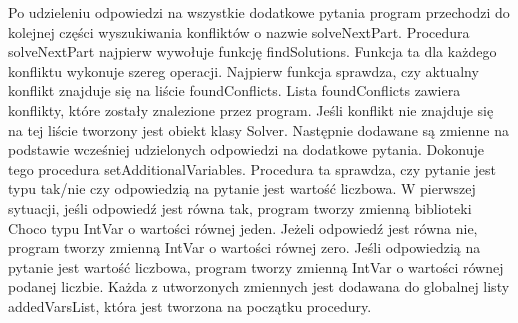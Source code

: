 Po udzieleniu odpowiedzi na wszystkie dodatkowe pytania program przechodzi do kolejnej części wyszukiwania konfliktów o nazwie solveNextPart. Procedura solveNextPart najpierw wywołuje funkcję findSolutions. 
Funkcja ta dla każdego konfliktu wykonuje szereg operacji. Najpierw funkcja sprawdza, czy aktualny konflikt znajduje się na liście foundConflicts. Lista foundConflicts zawiera konflikty, które zostały znalezione przez program. Jeśli konflikt nie znajduje się na tej liście tworzony jest obiekt klasy Solver. Następnie dodawane są zmienne na podstawie wcześniej udzielonych odpowiedzi na dodatkowe pytania. Dokonuje tego procedura setAdditionalVariables. Procedura ta sprawdza, czy pytanie jest typu tak/nie czy odpowiedzią na pytanie jest wartość liczbowa. W pierwszej sytuacji, jeśli odpowiedź jest równa tak, program tworzy zmienną biblioteki Choco typu IntVar o wartości równej jeden. Jeżeli odpowiedź jest równa nie, program tworzy zmienną IntVar o wartości równej zero. Jeśli odpowiedzią na pytanie jest wartość liczbowa, program tworzy zmienną IntVar o wartości równej podanej liczbie. Każda z utworzonych zmiennych jest dodawana do globalnej listy addedVarsList, która jest tworzona na początku procedury. 

